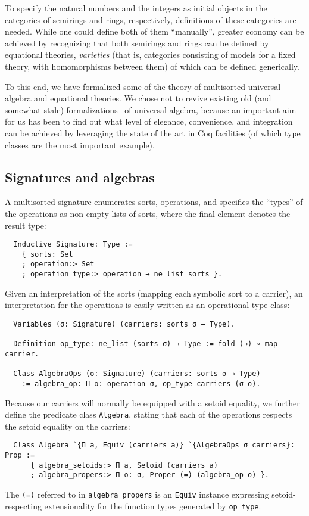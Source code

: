 \documentclass[a4paper,10pt,runningheads]{llncs}
\begin{document}
To specify the natural numbers and the integers as initial objects in the categories of semirings and rings, respectively, definitions of these categories are needed. While one could define both of them ``manually'', greater economy can be achieved by recognizing that both semirings and rings can be defined by equational theories, \emph{varieties} (that is, categories consisting of models for a fixed theory, with homomorphisms between them) of which can be defined generically.

To this end, we have formalized some of the theory of multisorted universal algebra and equational theories. We chose not to revive existing old (and somewhat stale) formalizations~\cite{DBLP:conf/tphol/Capretta99,dominguez2008formalizing} of universal algebra, because an important aim for us has been to find out what level of elegance, convenience, and integration can be achieved by leveraging the state of the art in Coq facilities (of which type classes are the most important example).

\subsection{Signatures and algebras}

A multisorted signature enumerates sorts, operations, and specifies the ``types'' of the operations as non-empty lists of sorts, where the final element denotes the result type:
\begin{lstlisting}
  Inductive Signature: Type :=
    { sorts: Set
    ; operation:> Set
    ; operation_type:> operation → ne_list sorts }.
\end{lstlisting}
Given an interpretation of the sorts (mapping each symbolic sort to a carrier), an interpretation for the operations is easily written as an operational type class:
\begin{lstlisting}
  Variables (σ: Signature) (carriers: sorts σ → Type).

  Definition op_type: ne_list (sorts σ) → Type := fold (→) ∘ map carrier.

  Class AlgebraOps (σ: Signature) (carriers: sorts σ → Type)
    := algebra_op: Π o: operation σ, op_type carriers (σ o).
\end{lstlisting}
Because our carriers will normally be equipped with a setoid equality, we further define the predicate class \lstinline|Algebra|, stating that each of the operations respects the setoid equality on the carriers:
\begin{lstlisting}
  Class Algebra `{Π a, Equiv (carriers a)} `{AlgebraOps σ carriers}: Prop :=
      { algebra_setoids:> Π a, Setoid (carriers a)
      ; algebra_propers:> Π o: σ, Proper (=) (algebra_op o) }.
\end{lstlisting}
The \lstinline|(=)| referred to in \lstinline|algebra_propers| is an \lstinline|Equiv| instance expressing setoid-respecting extensionality for the function types generated by \lstinline|op_type|.
\end{document}

